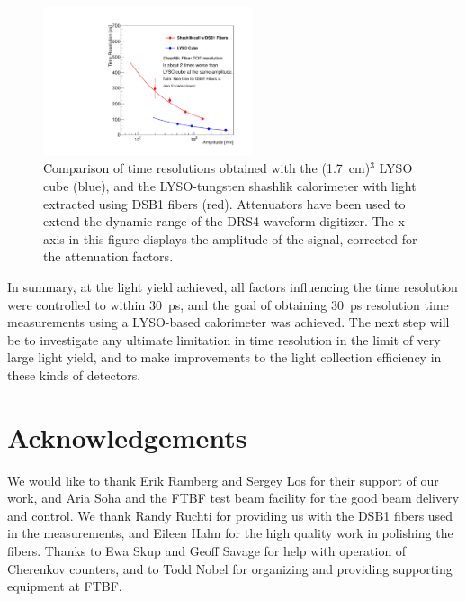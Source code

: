 \documentclass[12pt]{article}
\begin{document}
\begin{figure}[H] \centering
\includegraphics[width=0.55\textwidth]{figs/TimeResolutionVsEnergy_ShashlikDSB1FiberAndCube}
\caption{Comparison of time resolutions obtained with the (1.7~cm)$^3$ LYSO cube
(blue), and the LYSO-tungsten shashlik calorimeter with light extracted using
DSB1 fibers (red). Attenuators have been used to extend the dynamic range of the
DRS4 waveform digitizer. The x-axis in this figure displays the amplitude of the
signal, corrected for the attenuation factors.}
\label{fig:ShashlikFiberAndCubeTOF} \end{figure}

In summary, at the light yield achieved, all factors influencing the time resolution
were controlled to within $30$~ps, and the goal of obtaining $30$~ps
resolution time measurements using a LYSO-based calorimeter
was achieved. The next step will be to investigate any ultimate limitation in time 
resolution in the limit of very large light yield,
and to make improvements to the light collection efficiency 
in these kinds of detectors.

\section{Acknowledgements}
We would like to thank Erik Ramberg and Sergey Los for their support 
of our work, and Aria Soha and the FTBF test beam facility for the
good beam delivery and control. We thank Randy Ruchti for providing us
with the DSB1 fibers used in the measurements, and Eileen Hahn for the
high quality work in polishing the fibers. Thanks to Ewa Skup and Geoff
Savage for help with operation of Cherenkov counters, and to Todd Nobel
for organizing and providing supporting equipment at FTBF.


{}

\end{document}
